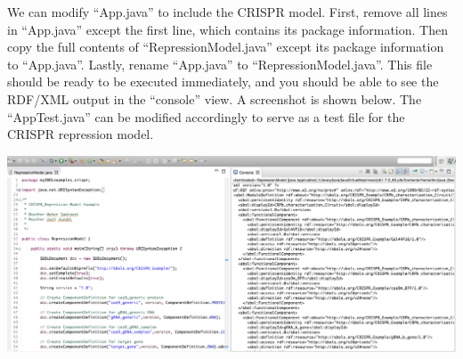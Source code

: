 We can modify ``App.java'' to include the CRISPR model. First, remove all lines in ``App.java'' except the first line, which contains its package information. Then copy the full contents of ``RepressionModel.java'' except its package information to ``App.java''. Lastly, rename ``App.java'' to ``RepressionModel.java''. This file should be ready to be executed immediately, and you should be able to see the RDF/XML output in the ``console'' view. A screenshot is shown below. The ``AppTest.java'' can be modified accordingly to serve as a test file for the CRISPR repression model. 
\begin{center}
  \includegraphics[width=\textwidth]{figures/addCrisprModel2}
\end{center}



